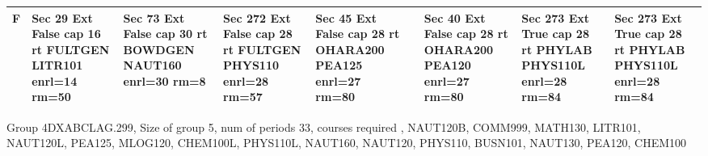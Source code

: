 \documentclass{article} \usepackage[margin=0.5in]{geometry}
\newcommand{\textgr}[1]{\cellcolor{gray!40}\textbf{#1}}
\begin{document}
\begin{tabular}{|c|z|z|z|z|z|z|z|z|}
\hline
\textgr{F} &  Sec 29 Ext False cap 16 rt FULTGEN LITR101 enrl=14 rm=50 & Sec 73 Ext False cap 30 rt BOWDGEN NAUT160 enrl=30 rm=8 & Sec 272 Ext False cap 28 rt FULTGEN PHYS110 enrl=28 rm=57 & Sec 45 Ext False cap 28 rt OHARA200 PEA125 enrl=27 rm=80 &  & Sec 40 Ext False cap 28 rt OHARA200 PEA120 enrl=27 rm=80 & Sec 273 Ext True cap 28 rt PHYLAB PHYS110L enrl=28 rm=84 & Sec 273 Ext True cap 28 rt PHYLAB PHYS110L enrl=28 rm=84 \\[65pt]
\hline
\end{tabular}

	
Group 4DXABCLAG.299, Size of group  5, num of periods 33, courses required , NAUT120B, COMM999, MATH130, LITR101, NAUT120L, PEA125, MLOG120, CHEM100L, PHYS110L, NAUT160, NAUT120, PHYS110, BUSN101, NAUT130, PEA120, CHEM100 
\newpage
	
\end{document}
